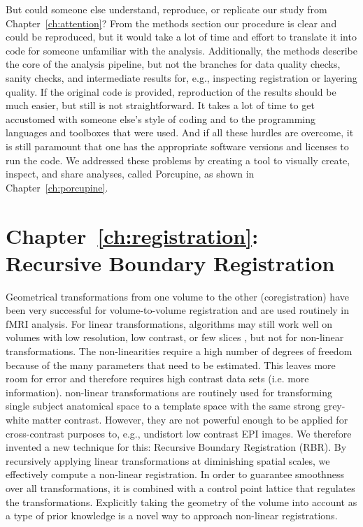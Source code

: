 But could someone else understand, reproduce, or replicate our study from Chapter~\ref{ch:attention}? From the methods section our procedure is clear and could be reproduced, but it would take a lot of time and effort to translate it into code for someone unfamiliar with the analysis. Additionally, the methods describe the core of the analysis pipeline, but not the branches for data quality checks, sanity checks, and intermediate results for, e.g., inspecting registration or layering quality. If the original code is provided, reproduction of the results should be much easier, but still is not straightforward. It takes a lot of time to get accustomed with someone else's style of coding and to the programming languages and toolboxes that were used. And if all these hurdles are overcome, it is still paramount that one has the appropriate software versions and licenses to run the code. We addressed these problems by creating a tool to visually create, inspect, and share analyses, called Porcupine, as shown in Chapter~\ref{ch:porcupine}.

\section*{Chapter~\ref{ch:registration}: Recursive Boundary Registration}
Geometrical transformations from one volume to the other (coregistration) have been very successful for volume-to-volume registration and are used routinely in fMRI analysis. For linear transformations, algorithms may still work well on volumes with low resolution, low contrast, or few slices \cite{Greve2009}, but not for non-linear transformations. The non-linearities require a high number of degrees of freedom because of the many parameters that need to be estimated. This leaves more room for error and therefore requires high contrast data sets (i.e. more information). non-linear transformations are routinely used for transforming single subject anatomical space to a template space with the same strong grey-white matter contrast. However, they are not powerful enough to be applied for cross-contrast purposes to, e.g., undistort low contrast EPI images. We therefore invented a new technique for this: Recursive Boundary Registration (RBR). By recursively applying linear transformations at diminishing spatial scales, we effectively compute a non-linear registration. In order to guarantee smoothness over all transformations, it is combined with a control point lattice that regulates the transformations. Explicitly taking the geometry of the volume into account as a type of prior knowledge is a novel way to approach non-linear registrations.

